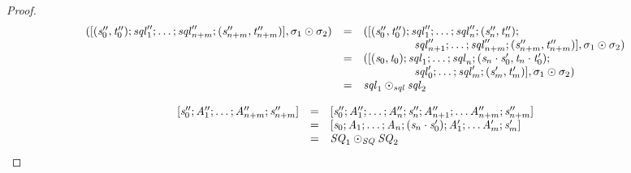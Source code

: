 \documentclass[numbers]{sigplanconf}
\begin{document}
\begin{proof}
  \[
    \begin{array}{rcl}
      ([(\mathit{s}_0'',\mathit{t}_0'');\mathit{sql}_1'';
      \ldots;
      \mathit{sql}_{n+m}'';(\mathit{s}_{n+m}'',\mathit{t}_{n+m}'')],
      \sigma_1\odot\sigma_2)
      & = & ([(\mathit{s}_0'',\mathit{t}_0'');\mathit{sql}_1'';
            \ldots;\mathit{sql}_n'';(\mathit{s}_n'',\mathit{t}_n'');\\
      & & \hspace*{4.5em}\mathit{sql}_{n+1}'';
          \ldots;\mathit{sql}_{n+m}'';(\mathit{s}_{n+m}'',\mathit{t}_{n+m}'')],
          \sigma_1\odot\sigma_2)\\
      & = & ([(\mathit{s}_0,\mathit{t}_0);\mathit{sql}_1;
            \ldots;\mathit{sql}_n;(\mathit{s}_n\cdot\mathit{s}_0',\mathit{t}_n\cdot\mathit{t}_0');\\
      & & \hspace*{4.5em}\mathit{sql}_0';
          \ldots;\mathit{sql}_m';(\mathit{s}_m',\mathit{t}_m')],
          \sigma_1\odot\sigma_2)\\
      & = & \mathit{sql}_1\odot_{\mathit{sql}}\mathit{sql}_2
    \end{array}
  \]


  \[
    \begin{array}{rcl}
      [\mathit{s}_0'';\mathit{A}_1'';\ldots;\mathit{A}_{n+m}'';\mathit{s}_{n+m}'']
      & = & [\mathit{s}_0'';\mathit{A}_1'';\ldots;\mathit{A}_n'';\mathit{s}_n'';\mathit{A}_{n+1}'';
            \ldots\mathit{A}_{n+m}'';\mathit{s}_{n+m}'']\\
      & = & [\mathit{s}_0;\mathit{A}_1;\ldots;\mathit{A}_n;(\mathit{s}_n\cdot\mathit{s}_0');\mathit{A}_1';
            \ldots\mathit{A}_m';\mathit{s}_m']\\
      & = & \mathit{SQ}_1\odot_{\mathit{SQ}}\mathit{SQ}_2
    \end{array}
  \]



\end{proof}
\end{document}
